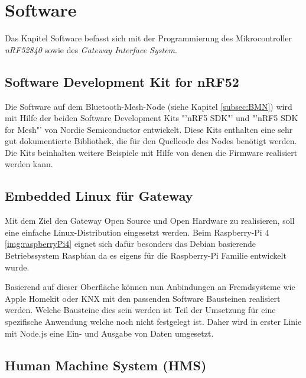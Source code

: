 \clearpage
\section{Software}\label{sec:Software}
Das Kapitel Software befasst sich mit der Programmierung des Mikrocontroller \textit{nRF52840} sowie des \textit{Gateway Interface System}.

\subsection{Software Development Kit for nRF52}\label{subsec:SDK}
Die Software auf dem Bluetooth-Mesh-Node (siehe Kapitel \ref{subsec:BMN})  wird mit Hilfe der beiden Software Development Kits "'nRF5 SDK"'\cite{nordic_semiconductor_nrf5_2019} und "'nRF5 SDK for Mesh"'\cite{nordic_semiconductor_nrf5_2019-1} von Nordic Semiconductor entwickelt. Diese Kits enthalten eine sehr gut dokumentierte Bibliothek, die für den Quellcode des Nodes benötigt werden. Die Kits beinhalten weitere Beispiele mit Hilfe von denen die Firmware realisiert werden kann.


\subsection{Embedded Linux für Gateway}\label{subsec:LinuxfürGateway}
Mit dem Ziel den Gateway Open Source und Open Hardware zu realisieren, soll eine einfache Linux-Distribution eingesetzt werden. Beim Raspberry-Pi 4 \ref{img:raspberryPi4} eignet sich dafür besonders das Debian basierende Betriebssystem Raspbian da es eigens für die Raspberry-Pi Familie entwickelt wurde.

Basierend auf dieser Oberfläche können nun Anbindungen an Fremdsysteme wie Apple Homekit oder KNX mit den passenden Software Bausteinen realisiert werden. Welche Bausteine dies sein werden ist Teil der Umsetzung für eine spezifische Anwendung welche noch nicht festgelegt ist. Daher wird in erster Linie mit Node.js eine Ein- und Ausgabe von Daten umgesetzt. 

\subsection{Human Machine System (HMS)}\label{subsec:HMS_SW}

